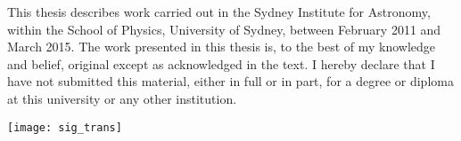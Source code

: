 


\begin{declaration}        %

This thesis describes work carried out in the Sydney Institute for Astronomy, within the School of Physics, University of Sydney, between February 2011 and March 2015. The work presented in this thesis is, to the best of my knowledge and belief, original except as acknowledged in the text. I hereby declare that I have not submitted this material, either in full or in part, for a degree or diploma at this university or any other institution.

\vspace{10mm}

\texttt{[image: sig\_trans]} \\
\theauthor{}\\
\date{April 21st, 2015}
\end{declaration}


